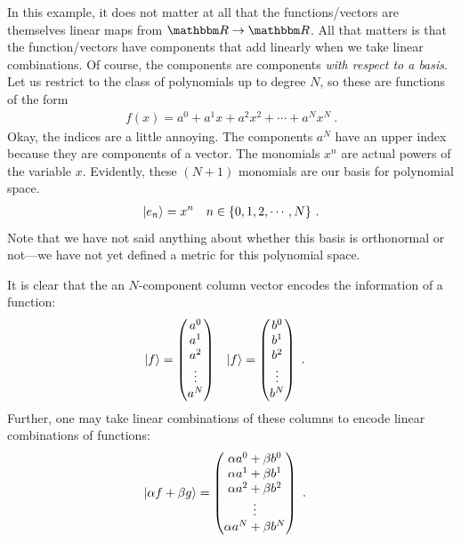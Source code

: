 In this example, it does not matter at all that the functions/vectors are themselves linear maps from $\RR \to \RR$. All that matters is that the function/vectors have components that add linearly when we take linear combinations. Of course, the components are components \emph{with respect to a basis}. Let us restrict to the class of polynomials up to degree $N$, so these are functions of the form
\begin{align}
    f(x) = a^0 + a^1 x + a^2 x^2 + \cdots + a^N x^N \ .
\end{align}
Okay, the indices are a little annoying. The components $a^N$ have an upper index because they are components of a vector. The monomials $x^n$ are actual powers of the variable $x$. Evidently, these $(N+1)$ monomials are our basis for polynomial space. 
\begin{align}
    \left|e_n\right\rangle &= x^n
    &
    n \in \{0, 1, 2, \cdots, N\} \ .
    \label{eq:polynomial:basis}
\end{align}
Note that we have not said anything about whether this basis is orthonormal or not---we have not yet defined a metric for this polynomial space. 

It is clear that the an $N$-component column vector encodes the information of a function:
\begin{align}
    \left|f\right\rangle &= 
    \begin{pmatrix}
        a^0 \\ a^1 \\ a^2 \\ \vdots \\ a^N
    \end{pmatrix} 
    &
\left|f\right\rangle &= 
    \begin{pmatrix}
        b^0 \\ b^1 \\ b^2 \\ \vdots \\ b^N
    \end{pmatrix} 
    \ .
\end{align}
Further, one may take linear combinations of these columns to encode linear combinations of functions:
\begin{align}
    \left|\alpha f + \beta g\right\rangle
    &= 
    \begin{pmatrix}
        \alpha a^0 + \beta b^0 \\ \alpha a^1 + \beta b^1 
        \\ \alpha a^2 + \beta b^2 \\ \vdots \\ 
        \alpha a^N + \beta b^N
    \end{pmatrix}  \ .
\end{align}

